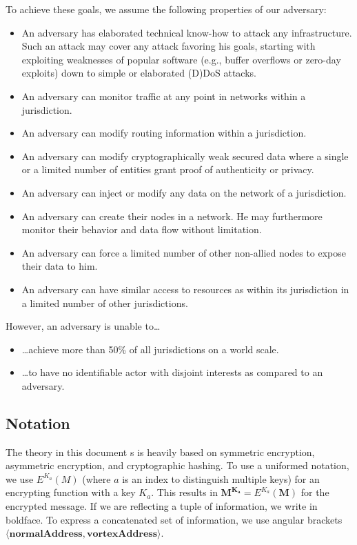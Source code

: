 \documentclass[acmsmall, screen, review]{acmart}
\begin{document}
	To achieve these goals, we assume the following properties of our adversary:
	\begin{itemize}
		\item An adversary has elaborated technical know-how to attack any infrastructure. Such an attack may cover any attack favoring his goals, starting with exploiting weaknesses of popular software (e.g., buffer overflows or zero-day exploits) down to simple or elaborated (D)DoS attacks.
		\item An adversary can monitor traffic at any point in networks within a jurisdiction.
		\item An adversary can modify routing information within a jurisdiction.
		\item An adversary can modify cryptographically weak secured data where a single or a limited number of entities grant proof of authenticity or privacy.
		\item An adversary can inject or modify any data on the network of a jurisdiction.
		\item An adversary can create their nodes in a network. He may furthermore monitor their behavior and data flow without limitation.
		\item An adversary can force a limited number of other non-allied nodes to expose their data to him. 
		\item An adversary can have similar access to resources as within its jurisdiction in a limited number of other jurisdictions.
	\end{itemize}
	
	However, an adversary is unable to\ldots\begin{itemize}
		\item \ldots{}achieve more than 50\% of all jurisdictions on a world scale. 
		\item \ldots{}to have no identifiable actor with disjoint interests as compared to an adversary.
	\end{itemize}
	
	\subsection{Notation \label{sec:encNot}}
	The theory in this document s is heavily based on symmetric encryption, asymmetric encryption, and cryptographic hashing. To use a uniformed notation, we use $E^{K_a}(M)$ (where $a$ is an index to distinguish multiple keys) for an encrypting function with a key $K_a$. This results in $\mathbf{M^{K_a}}=E^{K_a}(\mathbf{M})$ for the encrypted message. If we are reflecting a tuple of information, we write in boldface. To express a concatenated set of information, we use angular brackets $\mathbf{\langle normalAddress,vortexAddress\rangle }$. 
	
\end{document}
